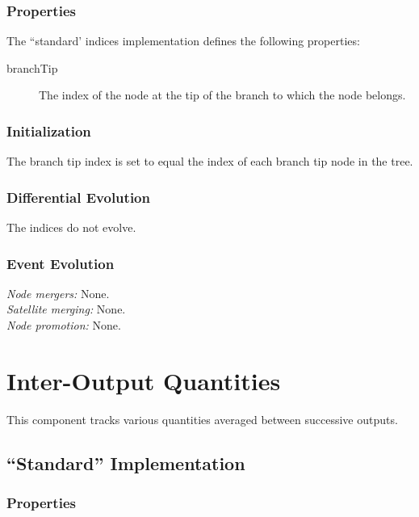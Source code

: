 \subsubsection{Properties}

The ``standard' indices implementation defines the following properties:
\begin{description}
 \item [{\normalfont \ttfamily branchTip}] The index of the node at the tip of the branch to which the node belongs.
\end{description}

\subsubsection{Initialization}

The branch tip index is set to equal the index of each branch tip node in the tree.

\subsubsection{Differential Evolution}

The indices do not evolve.

\subsubsection{Event Evolution}

\noindent\emph{Node mergers:} None.\\

\noindent\emph{Satellite merging:} None.\\

\noindent\emph{Node promotion:} None.\\

\section{Inter-Output Quantities}\label{sec:ComponentInterOutput}

This \gls{component} tracks various quantities averaged between successive outputs.

\subsection{``Standard'' Implementation}

\subsubsection{Properties}

